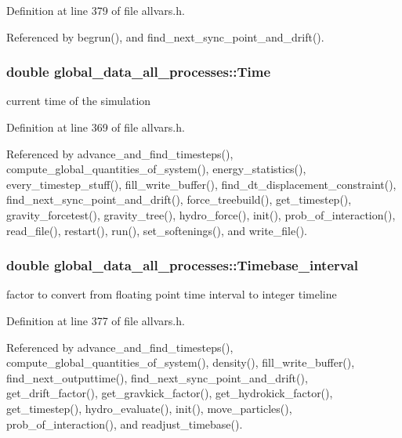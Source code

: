 Definition at line 379 of file allvars.h.



Referenced by begrun(), and find\_\-next\_\-sync\_\-point\_\-and\_\-drift().

\hypertarget{structglobal__data__all__processes_a25b9da73fdcbdc45fbe4a6ad45479f09}{
\subsubsection[{Time}]{\setlength{\rightskip}{0pt plus 5cm}double {\bf global\_\-data\_\-all\_\-processes::Time}}}
\label{structglobal__data__all__processes_a25b9da73fdcbdc45fbe4a6ad45479f09}
current time of the simulation 

Definition at line 369 of file allvars.h.



Referenced by advance\_\-and\_\-find\_\-timesteps(), compute\_\-global\_\-quantities\_\-of\_\-system(), energy\_\-statistics(), every\_\-timestep\_\-stuff(), fill\_\-write\_\-buffer(), find\_\-dt\_\-displacement\_\-constraint(), find\_\-next\_\-sync\_\-point\_\-and\_\-drift(), force\_\-treebuild(), get\_\-timestep(), gravity\_\-forcetest(), gravity\_\-tree(), hydro\_\-force(), init(), prob\_\-of\_\-interaction(), read\_\-file(), restart(), run(), set\_\-softenings(), and write\_\-file().

\hypertarget{structglobal__data__all__processes_a0dd4962a455bb955f04ec271d7af7bb4}{
\subsubsection[{Timebase\_\-interval}]{\setlength{\rightskip}{0pt plus 5cm}double {\bf global\_\-data\_\-all\_\-processes::Timebase\_\-interval}}}
\label{structglobal__data__all__processes_a0dd4962a455bb955f04ec271d7af7bb4}
factor to convert from floating point time interval to integer timeline 

Definition at line 377 of file allvars.h.



Referenced by advance\_\-and\_\-find\_\-timesteps(), compute\_\-global\_\-quantities\_\-of\_\-system(), density(), fill\_\-write\_\-buffer(), find\_\-next\_\-outputtime(), find\_\-next\_\-sync\_\-point\_\-and\_\-drift(), get\_\-drift\_\-factor(), get\_\-gravkick\_\-factor(), get\_\-hydrokick\_\-factor(), get\_\-timestep(), hydro\_\-evaluate(), init(), move\_\-particles(), prob\_\-of\_\-interaction(), and readjust\_\-timebase().

